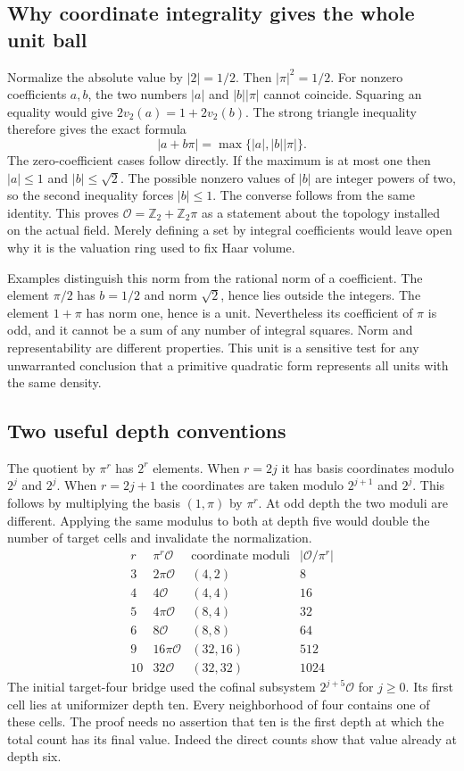 \documentclass[12pt,letterpaper]{article}
\begin{document}
\subsection{Why coordinate integrality gives the whole unit ball}
Normalize the absolute value by $|2|=1/2$. Then $|\pi|^2=1/2$. For nonzero coefficients $a,b$, the two numbers $|a|$ and $|b||\pi|$ cannot coincide. Squaring an equality would give $2v_2(a)=1+2v_2(b)$. The strong triangle inequality therefore gives the exact formula
\[
       |a+b\pi|=\max\{|a|,|b||\pi|\}.
\]
The zero-coefficient cases follow directly. If the maximum is at most one then $|a|\leq1$ and $|b|\leq\sqrt2$. The possible nonzero values of $|b|$ are integer powers of two, so the second inequality forces $|b|\leq1$. The converse follows from the same identity. This proves $\mathcal O=\mathbb Z_2+\mathbb Z_2\pi$ as a statement about the topology installed on the actual field. Merely defining a set by integral coefficients would leave open why it is the valuation ring used to fix Haar volume.
\par
Examples distinguish this norm from the rational norm of a coefficient. The element $\pi/2$ has $b=1/2$ and norm $\sqrt2$, hence lies outside the integers. The element $1+\pi$ has norm one, hence is a unit. Nevertheless its coefficient of $\pi$ is odd, and it cannot be a sum of any number of integral squares. Norm and representability are different properties. This unit is a sensitive test for any unwarranted conclusion that a primitive quadratic form represents all units with the same density.
\subsection{Two useful depth conventions}
The quotient by $\pi^r$ has $2^r$ elements. When $r=2j$ it has basis coordinates modulo $2^j$ and $2^j$. When $r=2j+1$ the coordinates are taken modulo $2^{j+1}$ and $2^j$. This follows by multiplying the basis $(1,\pi)$ by $\pi^r$. At odd depth the two moduli are different. Applying the same modulus to both at depth five would double the number of target cells and invalidate the normalization.
\[
\begin{array}{c|c|c|c}
 r&\pi^r\mathcal O& \text{coordinate moduli}& |\mathcal O/\pi^r|\\\hline
 3&2\pi\mathcal O&(4,2)&8\\
 4&4\mathcal O&(4,4)&16\\
 5&4\pi\mathcal O&(8,4)&32\\
 6&8\mathcal O&(8,8)&64\\
 9&16\pi\mathcal O&(32,16)&512\\
 10&32\mathcal O&(32,32)&1024
\end{array}
\]
The initial target-four bridge used the cofinal subsystem $2^{j+5}\mathcal O$ for $j\ge0$. Its first cell lies at uniformizer depth ten. Every neighborhood of four contains one of these cells. The proof needs no assertion that ten is the first depth at which the total count has its final value. Indeed the direct counts show that value already at depth six.
\end{document}
